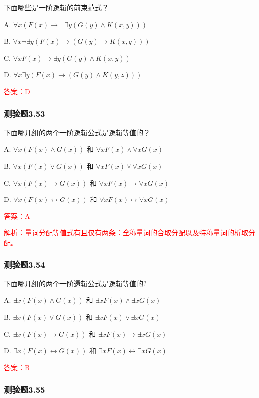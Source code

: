\documentclass[UTF8, heading=true]{ctexart}
\begin{document}
下面哪些是一阶逻辑的前束范式？

A. $\forall x(F(x) \rightarrow \neg \exists y(G(y) \wedge K(x, y)))$

B. $\forall x \neg \exists y(F(x) \rightarrow(G(y) \rightarrow K(x, y)))$

C. $\forall x F(x) \rightarrow \exists y(G(y) \wedge K(x, y))$

D. $\forall x \exists y(F(x) \rightarrow(G(y) \wedge K(y, z)))$

\textcolor{red}{答案：D}

\subsubsection{测验题3.53}

下面哪几组的两个一阶逻辑公式是逻辑等值的？

A. $\forall x(F(x) \wedge G(x))$ 和 $\forall x F(x) \wedge \forall x G(x)$

B. $\forall x(F(x) \vee G(x))$ 和 $\forall x F(x) \vee \forall x G(x)$

C. $\forall x(F(x) \rightarrow G(x))$ 和 $\forall x F(x) \rightarrow \forall x G(x)$

D. $\forall x(F(x) \leftrightarrow G(x))$ 和 $\forall x F(x) \leftrightarrow \forall x G(x)$

\textcolor{red}{答案：A}

\textcolor{red}{解析：量词分配等值式有且仅有两条：全称量词的合取分配以及特称量词的析取分配。}

\subsubsection{测验题3.54}

下面哪几组的两个一阶還辑公式是逻辑等值的?

A. $\exists x(F(x) \wedge G(x))$ 和 $\exists x F(x) \wedge \exists x G(x)$

B.  $\exists x(F(x) \vee G(x))$ 和 $\exists x F(x) \vee \exists x G(x)$

C. $\exists x(F(x) \rightarrow G(x))$ 和 $\exists x F(x) \rightarrow \exists x G(x)$

D. $\exists x(F(x) \leftrightarrow G(x))$ 和 $\exists x F(x) \leftrightarrow \exists x G(x)$


\textcolor{red}{答案：B}

\subsubsection{测验题3.55}
\end{document}
